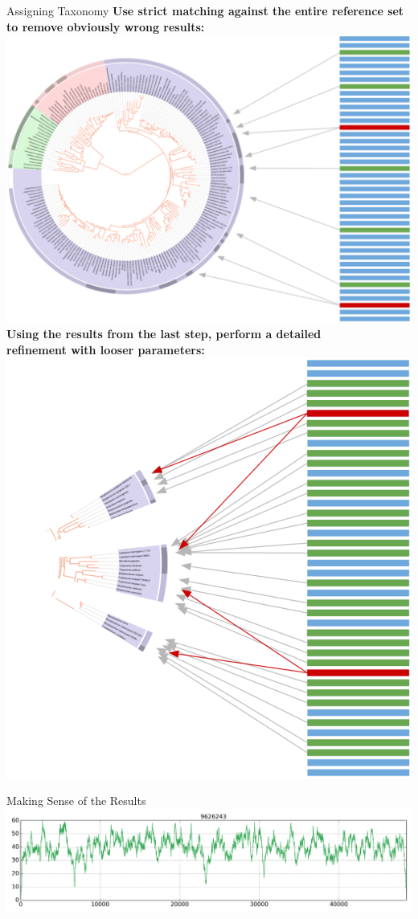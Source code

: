 \documentclass[final,t]{beamer}
\begin{document}
\begin{frame}{}
\begin{columns}[t]
\begin{column}{.3\linewidth}
        \begin{block}{Assigning Taxonomy}
            \textbf{Use strict matching against the entire reference set to remove obviously wrong results:}\\
            \includegraphics[width=.8\linewidth, right]{assets/Whole} \\
            \textbf{Using the results from the last step, perform a detailed\\ refinement with looser parameters:}\\
            \includegraphics[width=0.54\linewidth, right]{assets/Subset}
        \end{block}
        \begin{block}{Making Sense of the Results}
        \includegraphics[width=1\linewidth]{assets/coverage_plot_good}\newline\newline

\end{block}
\end{column}
\end{columns}
\end{frame}
\end{document}
